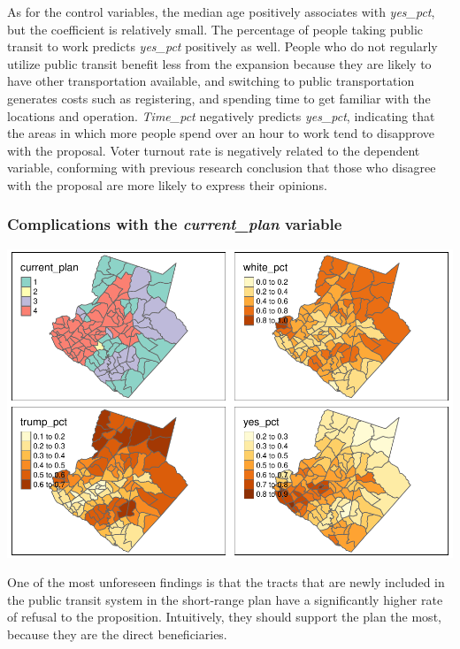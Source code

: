 \documentclass[
]{article}
\begin{document}
As for the control variables, the median age positively associates with
\emph{yes\_pct}, but the coefficient is relatively small. The percentage
of people taking public transit to work predicts \emph{yes\_pct}
positively as well. People who do not regularly utilize public transit
benefit less from the expansion because they are likely to have other
transportation available, and switching to public transportation
generates costs such as registering, and spending time to get familiar
with the locations and operation. \emph{Time\_pct} negatively predicts
\emph{yes\_pct}, indicating that the areas in which more people spend
over an hour to work tend to disapprove with the proposal. Voter turnout
rate is negatively related to the dependent variable, conforming with
previous research conclusion that those who disagree with the proposal
are more likely to express their opinions.

\hypertarget{complications-with-the-current_plan-variable}{%
\subsubsection{\texorpdfstring{Complications with the
\emph{current\_plan}
variable}{Complications with the current\_plan variable}}\label{complications-with-the-current_plan-variable}}

\includegraphics{Zhong_paper_files/figure-latex/unnamed-chunk-2-1.pdf}

One of the most unforeseen findings is that the tracts that are newly
included in the public transit system in the short-range plan have a
significantly higher rate of refusal to the proposition. Intuitively,
they should support the plan the most, because they are the direct
beneficiaries.
\end{document}
